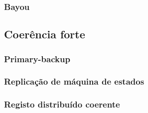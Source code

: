 \documentclass[12pt]{article}
\begin{document}
\subsubsection{Bayou}

\subsection{Coerência forte}

\subsubsection{Primary-backup}

\subsubsection{Replicação de máquina de estados}

\subsubsection{Registo distribuído coerente}

\newpage
\end{document}

